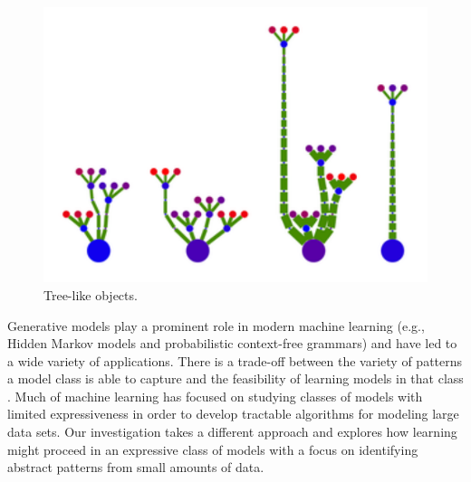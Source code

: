 \documentclass[a4paper,10pt]{article}
\begin{document}
\begin{figure}[b]
\begin{center}
\includegraphics[scale=.60]{../figures/trees.pdf}
\end{center}
\caption{Tree-like objects.}
\label{fig:plants}
\end{figure}



Generative models play a prominent role in modern machine learning (e.g., Hidden Markov models and probabilistic context-free grammars) and have led to a wide variety of applications.  There is a trade-off between the variety of patterns a model class is able to capture and the feasibility of learning models in that class \cite{Russell2003}.  Much of machine learning has focused on studying classes of models with limited expressiveness in order to develop tractable algorithms for modeling large data sets.  Our investigation takes a different approach and explores how learning might proceed in an expressive class of models with a focus on identifying abstract patterns from small amounts of data.
\end{document}
